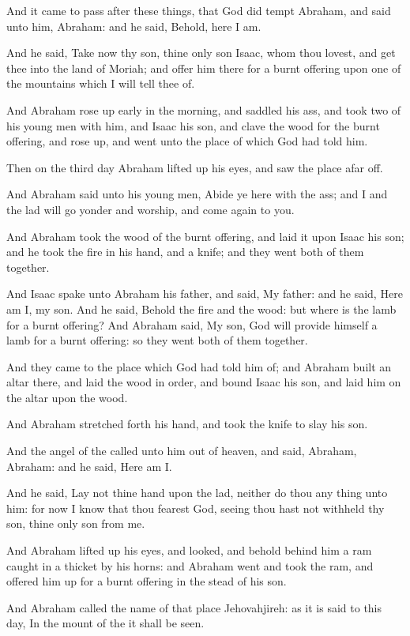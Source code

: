 \verse And it came to pass after these things, that God did tempt Abraham, and said unto him, Abraham: and he said, Behold, here I am.

\verse And he said, Take now thy son, thine only son Isaac, whom thou lovest, and get thee into the land of Moriah; and offer him there for a burnt offering upon one of the mountains which I will tell thee of.

\verse And Abraham rose up early in the morning, and saddled his ass, and took two of his young men with him, and Isaac his son, and clave the wood for the burnt offering, and rose up, and went unto the place of which God had told him.

\verse Then on the third day Abraham lifted up his eyes, and saw the place afar off.

\verse And Abraham said unto his young men, Abide ye here with the ass; and I and the lad will go yonder and worship, and come again to you.

\verse And Abraham took the wood of the burnt offering, and laid it upon Isaac his son; and he took the fire in his hand, and a knife; and they went both of them together.

\verse And Isaac spake unto Abraham his father, and said, My father: and he said, Here am I, my son. And he said, Behold the fire and the wood: but where is the lamb for a burnt offering?  \verse And Abraham said, My son, God will provide himself a lamb for a burnt offering: so they went both of them together.

\verse And they came to the place which God had told him of; and Abraham built an altar there, and laid the wood in order, and bound Isaac his son, and laid him on the altar upon the wood.

\verse And Abraham stretched forth his hand, and took the knife to slay his son.

\verse And the angel of the \LORD called unto him out of heaven, and said, Abraham, Abraham: and he said, Here am I.

\verse And he said, Lay not thine hand upon the lad, neither do thou any thing unto him: for now I know that thou fearest God, seeing thou hast not withheld thy son, thine only son from me.

\verse And Abraham lifted up his eyes, and looked, and behold behind him a ram caught in a thicket by his horns: and Abraham went and took the ram, and offered him up for a burnt offering in the stead of his son.

\verse And Abraham called the name of that place Jehovahjireh: as it is said to this day, In the mount of the \LORD it shall be seen.

